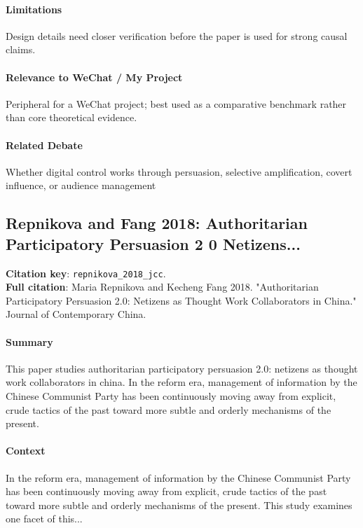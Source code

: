 \documentclass[12pt]{article}
\begin{document}
\paragraph{Limitations} Design details need closer verification before the paper is used for strong causal claims.

\paragraph{Relevance to WeChat / My Project} Peripheral for a WeChat project; best used as a comparative benchmark rather than core theoretical evidence.

\paragraph{Related Debate} Whether digital control works through persuasion, selective amplification, covert influence, or audience management


\subsection{Repnikova and Fang 2018: Authoritarian Participatory Persuasion 2 0 Netizens...}
\textbf{Citation key}: \texttt{repnikova\_2018\_jcc}.\\
\textbf{Full citation}: Maria Repnikova and Kecheng Fang 2018. "Authoritarian Participatory Persuasion 2.0: Netizens as Thought Work Collaborators in China." Journal of Contemporary China.

\paragraph{Summary} This paper studies authoritarian participatory persuasion 2.0: netizens as thought work collaborators in china. In the reform era, management of information by the Chinese Communist Party has been continuously moving away from explicit, crude tactics of the past toward more subtle and orderly mechanisms of the present.

\paragraph{Context} In the reform era, management of information by the Chinese Communist Party has been continuously moving away from explicit, crude tactics of the past toward more subtle and orderly mechanisms of the present. This study examines one facet of this...
\end{document}
